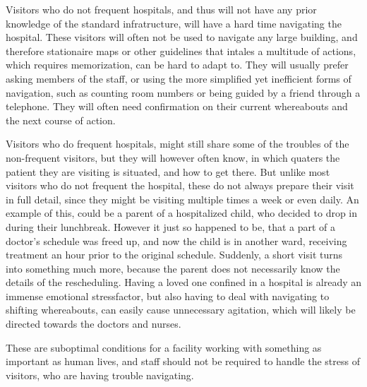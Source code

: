 Visitors who do not frequent hospitals, and thus will not have any prior knowledge of the standard infratructure, will have a hard time navigating the hospital. These visitors will often not be used to navigate any large building, and therefore stationaire maps or other guidelines that intales a multitude of actions, which requires memorization, can be hard to adapt to. They will usually prefer asking members of the staff, or using the more simplified yet inefficient forms of navigation, such as counting room numbers or being guided by a friend through a telephone. They will often need confirmation on their current whereabouts and the next course of action.

Visitors who do frequent hospitals, might still share some of the troubles of the non-frequent visitors, but they will however often know, in which quaters the patient they are visiting is situated, and how to get there. But unlike most visitors who do not frequent the hospital, these do not always prepare their visit in full detail, since they might be visiting multiple times a week or even daily. An example of this, could be a parent of a hospitalized child, who decided to drop in during their lunchbreak. However it just so happened to be, that a part of a doctor's schedule was freed up, and now the child is in another ward, receiving treatment an hour prior to the original schedule. Suddenly, a short visit turns into something much more, because the parent does not necessarily know the details of the rescheduling. Having a loved one confined in a hospital is already an immense emotional stressfactor, but also having to deal with navigating to shifting whereabouts, can easily cause unnecessary agitation, which will likely be directed towards the doctors and nurses.

These are suboptimal conditions for a facility working with something as important as human lives, and staff should not be required to handle the stress of visitors, who are having trouble navigating.




